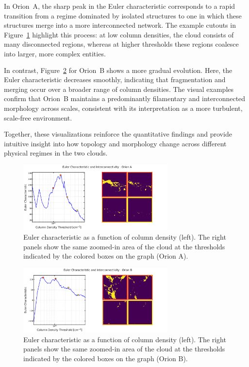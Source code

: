 In Orion~A, the sharp peak in the Euler characteristic corresponds to a rapid transition from a regime dominated by isolated structures to one in which these structures merge into a more interconnected network.  
The example cutouts in Figure~\ref{fig:Euler_Orion_A} highlight this process: at low column densities, the cloud consists of many disconnected regions, whereas at higher thresholds these regions coalesce into larger, more complex entities.

In contrast, Figure~\ref{fig:Euler_Orion_B} for Orion~B shows a more gradual evolution.  
Here, the Euler characteristic decreases smoothly, indicating that fragmentation and merging occur over a broader range of column densities.  
The visual examples confirm that Orion~B maintains a predominantly filamentary and interconnected morphology across scales, consistent with its interpretation as a more turbulent, scale‑free environment.

Together, these visualizations reinforce the quantitative findings and provide intuitive insight into how topology and morphology change across different physical regimes in the two clouds.

\begin{figure}[t]
    \centering
    \includegraphics[width=0.7\textwidth]{figures/euler_Orion_A.png}
    \caption{Euler characteristic as a function of column density (left). The right panels show the same zoomed-in area of the cloud at the thresholds indicated by the colored boxes on the graph (Orion A).}
    \label{fig:Euler_Orion_A}
\end{figure}

\begin{figure}[t]
    \centering
    \includegraphics[width=0.7\textwidth]{figures/euler_Orion_B.png}
    \caption{Euler characteristic as a function of column density (left). The right panels show the same zoomed-in area of the cloud at the thresholds indicated by the colored boxes on the graph (Orion B).}
    \label{fig:Euler_Orion_B}
\end{figure}

